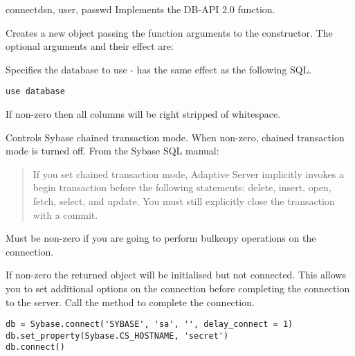 \begin{funcdesc}{connect}{dsn, user, passwd \optional{, \ldots}}
Implements the DB-API 2.0  function.

Creates a new  object passing the function arguments
to the  constructor.  The
optional arguments and their effect are:

\begin{description}
\item{}

Specifies the database to use - has the same effect as the following
SQL.

\begin{verbatim}
use database
\end{verbatim}

\item{}

If non-zero then all  columns will be right stripped of
whitespace.

\item{}

Controls Sybase chained transaction mode.  When non-zero, chained
transaction mode is turned off.  From the Sybase SQL manual:

\begin{quote}
If you set chained transaction mode, Adaptive Server implicitly
invokes a begin transaction before the following statements: delete,
insert, open, fetch, select, and update. You must still explicitly
close the transaction with a commit.
\end{quote}

\item{}

Must be non-zero if you are going to perform bulkcopy operations on
the connection.

\item{}

If non-zero the returned  object will be initialised
but not connected.  This allows you to set additional options on the
connection before completing the connection to the server.  Call the
 method to complete the connection.

\begin{verbatim}
db = Sybase.connect('SYBASE', 'sa', '', delay_connect = 1)
db.set_property(Sybase.CS_HOSTNAME, 'secret')
db.connect()
\end{verbatim}
\end{description}
\end{funcdesc}


